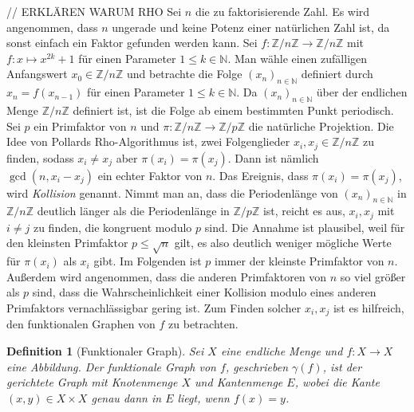 \documentclass[a4paper, 11pt, ngerman]{article}
\newcommand{\N}{\mathbb{N}}
\newcommand{\Z}{\mathbb{Z}}
\newtheorem{definition}{Definition}
\begin{document}
// ERKLÄREN WARUM RHO
Sei $n$ die zu faktorisierende Zahl. Es wird angenommen, dass $n$ ungerade und keine Potenz einer natürlichen Zahl ist, da sonst einfach ein Faktor gefunden werden kann. Sei $f : \Z/n\Z \to \Z/n\Z$ mit $f : x \mapsto x^{2k} + 1$ für einen Parameter $1 \le k \in \N$. Man wähle einen zufälligen Anfangswert $x_0 \in \Z/n\Z$ und betrachte die Folge $(x_n)_{n \in \N}$ definiert durch $x_n = f(x_{n - 1})$ für einen Parameter $1 \le k \in \N$. Da $(x_n)_{n \in \N}$ über der endlichen Menge $\Z/n\Z$ definiert ist, ist die Folge ab einem bestimmten Punkt periodisch. Sei $p$ ein Primfaktor von $n$ und $\pi : \Z/n\Z \to \Z/p\Z$ die natürliche Projektion. Die Idee von Pollards Rho-Algorithmus ist, zwei Folgenglieder $x_i, x_j \in \Z/n\Z$ zu finden, sodass $x_i \ne x_j$ aber $\pi(x_i) = \pi(x_j)$. Dann ist nämlich $\gcd(n, x_i - x_j)$ ein echter Faktor von $n$. Das Ereignis, dass $\pi(x_i) = \pi(x_j)$, wird \emph{Kollision} genannt. Nimmt man an, dass die Periodenlänge von $(x_n)_{n \in \N}$ in $\Z/n\Z$ deutlich länger als die Periodenlänge in $\Z/p\Z$ ist, reicht es aus, $x_i, x_j$ mit $i \ne j$ zu finden, die kongruent modulo $p$ sind. Die Annahme ist plausibel, weil für den kleinsten Primfaktor $p \le \sqrt n$ gilt, es also deutlich weniger mögliche Werte für $\pi(x_i)$ als $x_i$ gibt. Im Folgenden ist $p$ immer der kleinste Primfaktor von $n$. Außerdem wird angenommen, dass die anderen Primfaktoren von $n$ so viel größer als $p$ sind, dass die Wahrscheinlichkeit einer Kollision modulo eines anderen Primfaktors vernachlässigbar gering ist. Zum Finden solcher $x_i, x_j$ ist es hilfreich, den funktionalen Graphen von $f$ zu betrachten.

\begin{definition}[Funktionaler Graph]
    Sei $X$ eine endliche Menge und $f: X \to X$ eine Abbildung. Der funktionale Graph von $f$, geschrieben $\gamma(f)$, ist der gerichtete Graph mit Knotenmenge $X$ und Kantenmenge $E$, wobei die Kante $(x, y) \in X \times X$ genau dann in $E$ liegt, wenn $f(x) = y$.
\end{definition}
\end{document}

